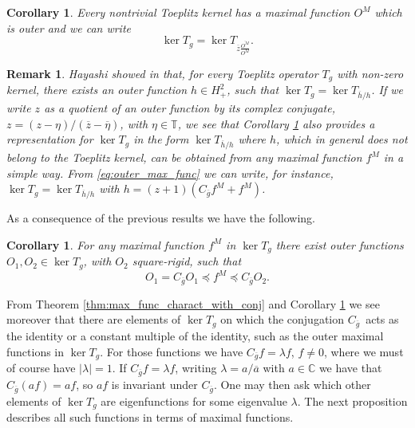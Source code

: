 \documentclass[12pt]{elsarticle}
\numberwithin{equation}{section}
\theoremstyle{plain}
\newtheorem{cor}[thm]{Corollary}
\newtheorem{rem}[thm]{Remark}
\newcommand{\Hp}{\ensuremath{H^2_+}}
\newcommand{\TT}{\ensuremath{\mathbb{T}}}
\newcommand{\CC}{\ensuremath{\mathbb{C}}}
\newcommand{\Cg}{\ensuremath{C_{\ol g}}}
\newcommand{\ol}[1]{\ensuremath{\overline{#1}}}
\begin{document}
\begin{cor}
\label{cor:outer_max_func}
Every nontrivial Toeplitz kernel has a maximal function $O^M$ which is outer and we can write
\begin{equation}
\label{eq:outer_max_func}
\ker T_g = \ker T_{\ol z \frac{\ol{O^M}}{O^M}}.
\end{equation}
\end{cor}


\begin{rem}
\label{rem:kernel_symbol_outer_Hayashi}
Hayashi showed in \cite[Lemma 5]{Ha85} that, for every Toeplitz operator $T_g$ with non-zero kernel, there exists an outer function $h\in\Hp$, such that $\ker T_g = \ker T_{\ol h /h}$.
If we write $z$ as a quotient of an outer function by its complex conjugate, $z=(z - \eta) / (\ol z - \ol\eta)$, with $\eta\in\TT$, we see that Corollary \ref{cor:outer_max_func} also provides a representation for $\ker T_g$ in the form $\ker T_{\ol h /h}$ where $h$, which in general does not belong to the Toeplitz kernel, can be obtained from any maximal function $f^M$ in a simple way.
From \eqref{eq:outer_max_func} we can write, for instance, $\ker T_g = \ker T_{\ol h /h}$ with $h= (z+1) (\Cg f^M + f^M)$.
\end{rem}


As a consequence of the previous results we have the following.

\begin{cor}
For any maximal function $f^M$ in $\ker T_g$ there exist outer functions $O_1,O_2\in\ker T_g$, with $O_2$ square-rigid, such that
\begin{equation*}
O_1 = \Cg O_1 \preceq f^M \preceq \Cg O_2.
\end{equation*}
\end{cor}


From Theorem \ref{thm:max_func_charact_with_conj} and Corollary \ref{cor:outer_max_func} we see moreover that there are elements of $\ker T_g$ on which the conjugation \Cg\ acts as the identity or a constant multiple of the identity, such as the outer maximal functions in $\ker T_g$.
For those functions we have $\Cg f = \lambda f$, $f\neq 0$, where we must of course have $|\lambda|=1$.
If $\Cg f = \lambda f$, writing $\lambda = a / \ol a$ with $a\in\CC$ we have that $\Cg (af) = af$, so $af$ is invariant under \Cg.
One may then ask which other elements of $\ker T_g$ are eigenfunctions for some eigenvalue $\lambda$.
The next proposition describes all such functions in terms of maximal functions.
\end{document}
